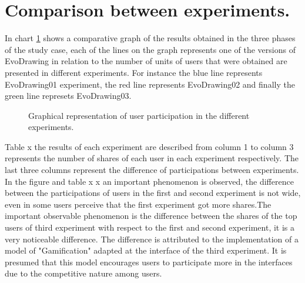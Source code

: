\section{Comparison between experiments.} 
In chart \ref{fig:comparison} shows a comparative graph of the results obtained in the three phases 
of the study case, each of the lines on the graph represents one of the versions 
of EvoDrawing in relation to the number of units of users that were obtained 
are presented in different experiments. For instance the blue line represents 
EvoDrawing01 experiment, the red line represents EvoDrawing02 and finally the
green line represets EvoDrawing03.


\begin{figure}
\centering
{} %
\caption{Graphical representation of user participation in the different experiments.}
\label{fig:comparison}   
\end{figure}

Table x the results of each experiment are described from column 1 to column 3
represents the number of shares of each user in each experiment respectively.
The last three columns represent the difference of participations between
experiments. In the figure and table x x an important phenomenon is observed,
the difference between the participations of users in the first and second
experiment is not wide, even in some users perceive that the first experiment
got more shares.The important observable phenomenon is the difference between
the shares of the top users of third experiment with respect to the first and
second experiment, it is a very noticeable difference. The difference is
attributed to the implementation of a model of "Gamification" adapted at the
interface of the third experiment. It is presumed that this model encourages
users to participate more in the interfaces due to the competitive nature among
users.




